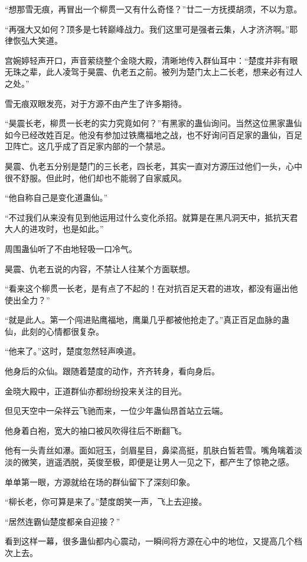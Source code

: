 \begin{this_body}
“想那雪无痕，再冒出一个柳贯一又有什么奇怪？”廿二一方抚摸胡须，不以为意。

“再强大又如何？顶多是七转巅峰战力。我们这里可是强者云集，人才济济啊。”耶律恢弘大笑道。

宫婉婷轻声开口，声音萦绕整个金晓大殿，清晰地传入群仙耳中：“楚度并非有眼无珠之辈，此人凌驾于昊震、仇老五之前。被列为楚门太上二长老，想来必有过人之处。”

雪无痕双眼发亮，对于方源不由产生了许多期待。

“昊震长老，柳贯一长老的实力究竟如何？”有黑家的蛊仙询问。当然这位黑家蛊仙如今已经改姓百足。他没有参加过铁鹰福地之战，也不好询问百足家的蛊仙，百足卫阵亡。这几乎成了百足家内部的一个禁忌。

昊震、仇老五分别是楚门的三长老，四长老，其实一直对方源压过他们一头，心中很不舒服。但此时，他们却也不能弱了自家威风。

“他自称自己是变化道蛊仙。”

“不过我们从来没有见到他运用过什么变化杀招。就算是在黑凡洞天中，抵抗天君大人的进攻时，也是如此。”

周围蛊仙听了不由地轻吸一口冷气。

昊震、仇老五说的内容，不禁让人往某个方面联想。

“看来这个柳贯一长老，是有点了不起的！在对抗百足天君的进攻，都没有逼出他使出全力？”

“就是此人。第一个闯进贴鹰福地，鹰巢几乎都被他抢走了。”真正百足血脉的蛊仙，此刻的心情都很复杂。

“他来了。”这时，楚度忽然轻声唤道。

他身后的众仙。跟随着楚度的动作，齐齐转身，看向身后。

金晓大殿中，正道群仙亦都纷纷投来关注的目光。

但见天空中一朵祥云飞驰而来，一位少年蛊仙昂首站立云端。

他身着白袍，宽大的袖口被风吹得往后不断翻飞。

他有一头青丝如瀑。面如冠玉，剑眉星目，鼻梁高挺，肌肤白皙若雪。嘴角噙着淡淡的微笑，逍遥洒脱，英俊至极，即便是让男人一见之下，都产生了惊艳之感。

单单第一眼，方源就给在场的群仙留下了深刻印象。

“柳长老，你可算是来了。”楚度朗笑一声，飞上去迎接。

“居然连霸仙楚度都亲自迎接？”

看到这样一幕，很多蛊仙都内心震动，一瞬间将方源在心中的地位，又提高几个档次上去。


\end{this_body}

